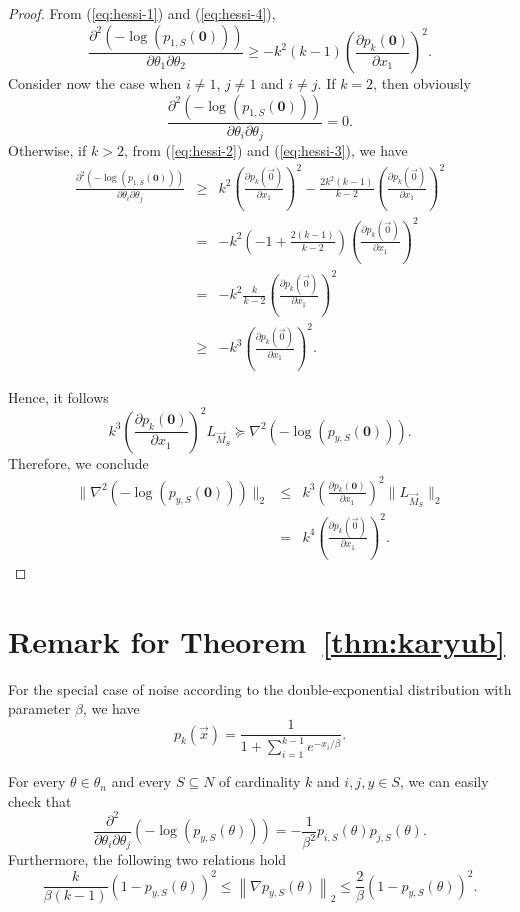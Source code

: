 \begin{proof}
From (\ref{eq:hessi-1}) and (\ref{eq:hessi-4}),
$$
\frac{\partial^2(-\log(p_{1,S} ({\bm 0})))}{\partial \theta_1 \partial \theta_2} 
\geq - k^2(k-1)\left( \frac{\partial p_k({\bm 0})}{\partial x_1}\right)^2.
$$
Consider now the case when $i\neq 1$, $j\neq 1$ and $i\neq j$. If $k = 2$, then obviously 
$$
\frac{\partial^2 (-\log(p_{1,S} ({\bm 0})))}{\partial \theta_i \partial \theta_j} = 0.
$$
Otherwise, if $k > 2$, from (\ref{eq:hessi-2}) and (\ref{eq:hessi-3}), we have
\begin{eqnarray*}
\frac{\partial^2 (-\log(p_{1,S} ({\bm 0})))}{\partial \theta_i \partial \theta_j} & \geq & k^2 \left(\frac{\partial p_k(\vec{0})}{\partial x_1}\right)^2 - \frac{2k^2(k-1)}{k-2} \left(\frac{\partial p_k(\vec{0})}{\partial x_1}\right)^2\\
& = & -k^2\left(-1 + \frac{2(k-1)}{k-2}\right)\left(\frac{\partial p_k(\vec{0})}{\partial x_1}\right)^2\\
& = & -k^2 \frac{k}{k-2}\left(\frac{\partial p_k(\vec{0})}{\partial x_1}\right)^2\\
& \geq & -k^3 \left(\frac{\partial p_k(\vec{0})}{\partial x_1}\right)^2.
\end{eqnarray*}


Hence, it follows  
$$
k^3 \left( \frac{\partial p_k({\bm 0})}{\partial x_1}\right)^2 L_{\vec{M}_S} \succeq \nabla^2 (-\log(p_{y,S} ({\bm 0}))).
$$
Therefore, we conclude
\begin{eqnarray*}
\|\nabla^2 (-\log(p_{y,S} ({\bm 0}))) \|_2 &\leq & k^3 \left( \frac{\partial p_k({\bm 0})}{\partial x_1}\right)^2 \|L_{\vec{M}_S}\|_2\\
& = & k^4 \left(\frac{\partial p_k(\vec{0})}{\partial x_1}\right)^2.
\end{eqnarray*}
\end{proof}


\section{Remark for Theorem~\ref{thm:karyub}}

For the special case of noise according to the double-exponential distribution with parameter $\beta$, we have
$$
p_k(\vec{x})=\frac{1}{1+\sum_{i=1}^{k-1}e^{-x_i/\beta}}.
$$

For every $\theta\in \theta_n$ and every $S\subseteq N$ of cardinality $k$ and $i,j,y\in S$, we can easily check that
$$
\frac{\partial^2}{\partial \theta_i \partial \theta_j} (-\log(p_{y,S}(\theta))) = -\frac{1}{\beta^2} p_{i,S}(\theta)p_{j,S}(\theta).
$$
Furthermore, the following two relations hold
$$
\frac{k}{\beta(k-1)}\left(1-p_{y,S}(\theta)\right)^2 \le \left\|\nabla p_{y,S}(\theta)\right\|_2 \le \frac{2}{\beta}\left(1-p_{y,S}(\theta) \right)^2.
$$

